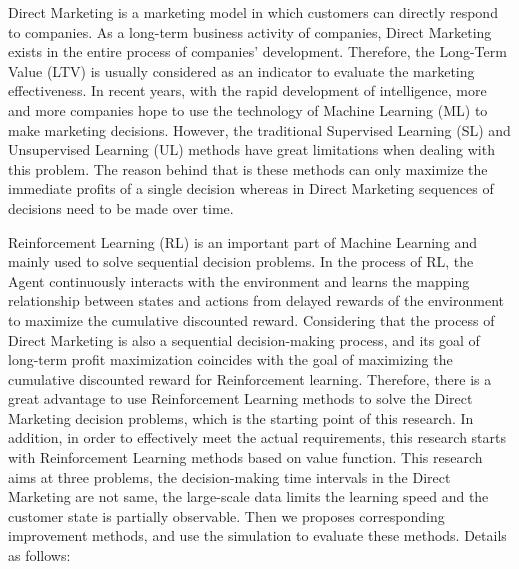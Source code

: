 \begin{enabstract}

Direct Marketing is a marketing model in which customers can directly respond to companies. As a long-term business activity of companies, Direct Marketing exists in the entire process of companies' development. Therefore, the Long-Term Value (LTV) is usually considered as an indicator to evaluate the marketing effectiveness. In recent years, with the rapid development of intelligence, more and more companies hope to use the technology of Machine Learning (ML) to make marketing decisions. However, the traditional Supervised Learning (SL) and Unsupervised Learning (UL) methods have great limitations when dealing with this problem. The reason behind that is these methods can only maximize the immediate profits of a single decision whereas in Direct Marketing sequences of decisions need to be made over time.

Reinforcement Learning (RL) is an important part of Machine Learning and mainly used to solve sequential decision problems. In the process of RL, the Agent continuously interacts with the environment and learns the mapping relationship between states and actions from delayed rewards of the environment to maximize the cumulative discounted reward. Considering that the process of Direct Marketing is also a sequential decision-making process, and its goal of long-term profit maximization coincides with the goal of maximizing the cumulative discounted reward for Reinforcement learning. Therefore, there is a great advantage to use Reinforcement Learning methods to solve the Direct Marketing decision problems, which is the starting point of this research. In addition, in order to effectively meet the actual requirements, this research starts with Reinforcement Learning methods based on value function. This research aims at three problems, the decision-making time intervals in the Direct Marketing are not same, the large-scale data limits the learning speed and the customer state is partially observable. Then we proposes corresponding improvement methods, and use the simulation to evaluate these methods. Details as follows:


\end{enabstract}
